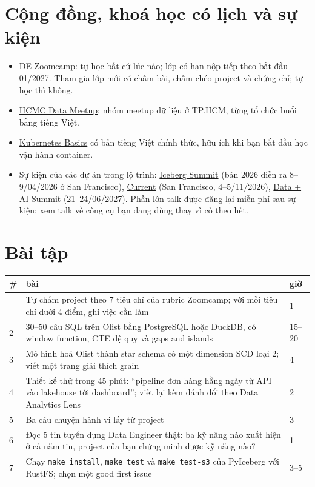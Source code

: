 \documentclass[11pt,a4paper,oneside]{report}
\newcommand{\thd}[1]{\textbf{\sffamily\small #1}}
\newcommand{\code}[1]{\texttt{#1}}
\begin{document}
\section{Cộng đồng, khoá học có lịch và sự kiện}
\begin{itemize}
  \item \href{https://github.com/DataTalksClub/data-engineering-zoomcamp}{DE Zoomcamp}: tự học bất cứ lúc nào; lớp có hạn nộp tiếp theo bắt đầu 01/2027. Tham gia lớp mới có chấm bài, chấm chéo project và chứng chỉ; tự học thì không.
  \item \href{https://meetup.com/ho-chi-minh-city-data-meetup-group}{HCMC Data Meetup}: nhóm meetup dữ liệu ở TP.HCM, từng tổ chức buổi bằng tiếng Việt.
  \item \href{https://kubernetes.io/vi/docs/tutorials/kubernetes-basics/}{Kubernetes Basics} có bản tiếng Việt chính thức, hữu ích khi bạn bắt đầu học vận hành container.
  \item Sự kiện của các dự án trong lộ trình: \href{https://www.icebergsummit.org/}{Iceberg Summit} (bản 2026 diễn ra 8--9/04/2026 ở San Francisco), \href{https://current.confluent.io/}{Current} (San Francisco, 4--5/11/2026), \href{https://www.databricks.com/dataaisummit}{Data + AI Summit} (21--24/06/2027). Phần lớn talk được đăng lại miễn phí sau sự kiện; xem talk về công cụ bạn đang dùng thay vì cố theo hết.
\end{itemize}

\section{Bài tập}
\begin{xltabular}{\textwidth}{@{}P{0.6cm} L P{1.8cm}@{}}
\toprule
\thd{\#} & \thd{bài} & \thd{giờ} \\
\midrule
\endhead
\bottomrule
{} & Tự chấm project theo 7 tiêu chí của rubric Zoomcamp; với mỗi tiêu chí dưới 4 điểm, ghi việc cần làm & 1 \\
2 & 30--50 câu SQL trên Olist bằng PostgreSQL hoặc DuckDB, có window function, CTE đệ quy và gaps and islands & 15--20 \\
3 & Mô hình hoá Olist thành star schema có một dimension SCD loại 2; viết một trang giải thích grain & 4 \\
4 & Thiết kế thử trong 45 phút: ``pipeline đơn hàng hằng ngày từ API vào lakehouse tới dashboard''; viết lại kèm đánh đổi theo Data Analytics Lens & 2 \\
5 & Ba câu chuyện hành vi lấy từ project & 3 \\
6 & Đọc 5 tin tuyển dụng Data Engineer thật: ba kỹ năng nào xuất hiện ở cả năm tin, project của bạn chứng minh được kỹ năng nào? & 1 \\
7 & Chạy \code{make install}, \code{make test} và \code{make test-s3} của PyIceberg với RustFS; chọn một good first issue & 3--5 \\
\end{xltabular}
\end{document}
